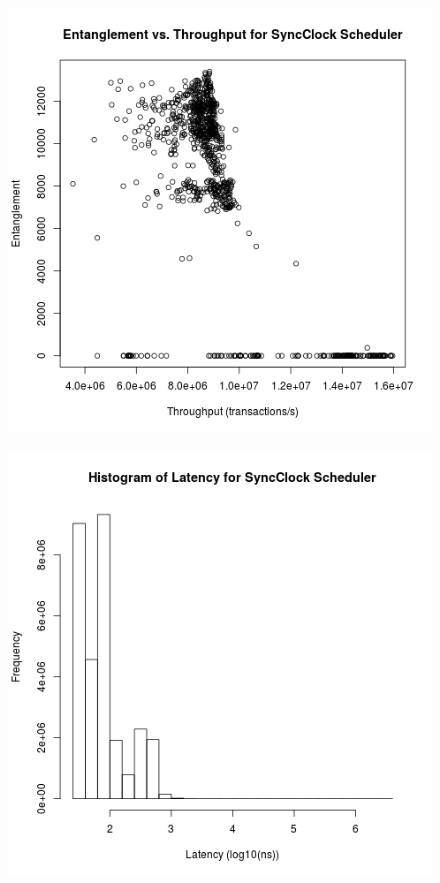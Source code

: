\begin{figure}
\center
\includegraphics[width=\textwidth]{sync_clock_throughput_entanglement.png}
\caption{\label{sync_clock_throughput_entanglement}}
\end{figure}


\begin{figure}
\center
\includegraphics[width=\textwidth]{sync_clock_latency_hist.png}
\caption{\label{sync_clock_latency}}
\end{figure}

